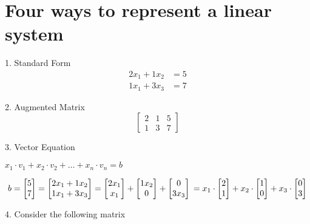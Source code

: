 \documentclass[12pt]{article}
\begin{document}

\section{Four ways to represent a linear system}

\noindent

1. Standard Form
\begin{align*}
  2x_1 + 1x_2 &= 5 \\
  1x_1 + 3x_3 &= 7 
\end{align*}

2. Augmented Matrix
$$
  \begin{bmatrix}
    2 & 1 & 5 \\
    1 & 3 & 7
  \end{bmatrix}
$$

3. Vector Equation

$x_1 \cdot v_1 + x_2 \cdot v_2 + \dots + x_n \cdot v_n = b$

\begin{equation*}
b=\begin{bmatrix} 5 \\ 7 \end{bmatrix} =
\begin{bmatrix} 2x_1 + 1x_2 \\ 1x_1 + 3x_3 \end{bmatrix} =
\begin{bmatrix} 2x_1 \\ x_1 \end{bmatrix} +
\begin{bmatrix} 1x_2 \\ 0 \end{bmatrix} +
\begin{bmatrix} 0 \\ 3x_3 \end{bmatrix} \\ = 
x_1 \cdot \begin{bmatrix} 2 \\ 1 \end{bmatrix} +
x_2 \cdot \begin{bmatrix} 1 \\ 0 \end{bmatrix} +
x_3 \cdot \begin{bmatrix} 0 \\ 3 \end{bmatrix}
\end{equation*}

4. Consider the following matrix
\end{document}
